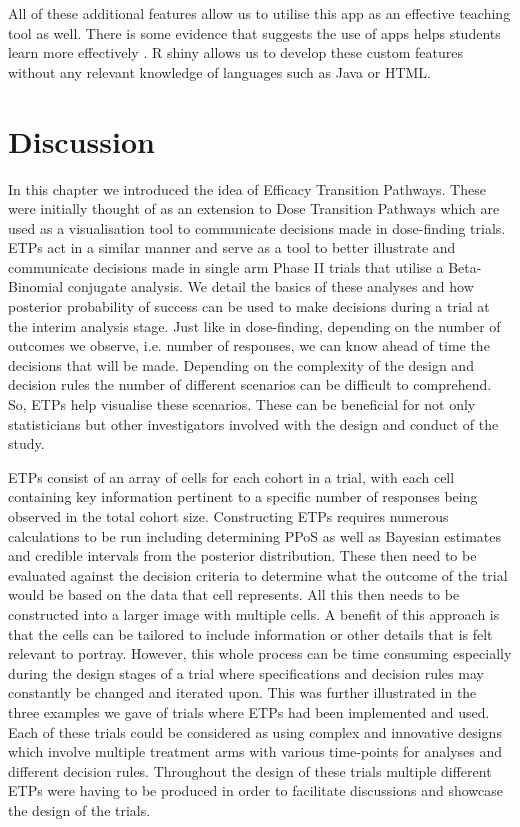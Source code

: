 All of these additional features allow us to utilise this app as an effective teaching tool as well. There is some evidence that suggests the use of apps helps students learn more effectively \cite{doiWebApplicationTeaching2016}. R shiny allows us to develop these custom features without any relevant knowledge of languages such as Java or HTML. 


\section{Discussion}

In this chapter we introduced the idea of Efficacy Transition Pathways. These were initially thought of as an extension to Dose Transition Pathways which are used as a visualisation tool to communicate decisions made in dose-finding trials. ETPs act in a similar manner and serve as a tool to better illustrate and communicate decisions made in single arm Phase \RN{2} trials that utilise a Beta-Binomial conjugate analysis. We detail the basics of these analyses and how posterior probability of success can be used to make decisions during a trial at the interim analysis stage. Just like in dose-finding, depending on the number of outcomes we observe, i.e. number of responses, we can know ahead of time the decisions that will be made. Depending on the complexity of the design and decision rules the number of different scenarios can be difficult to comprehend. So, ETPs help visualise these scenarios. These can be beneficial for not only statisticians but other investigators involved with the design and conduct of the study. 

ETPs consist of an array of cells for each cohort in a trial, with each cell containing key information pertinent to a specific number of responses being observed in the total cohort size. Constructing ETPs requires numerous calculations to be run including determining PPoS as well as Bayesian estimates and credible intervals from the posterior distribution. These then need to be evaluated against the decision criteria to determine what the outcome of the trial would be based on the data that cell represents. All this then needs to be constructed into a larger image with multiple cells. A benefit of this approach is that the cells can be tailored to include information or other details that is felt relevant to portray. However, this whole process can be time consuming especially during the design stages of a trial where specifications and decision rules may constantly be changed and iterated upon. This was further illustrated in the three examples we gave of trials where ETPs had been implemented and used. Each of these trials could be considered as using complex and innovative designs which involve multiple treatment arms with various time-points for analyses and different decision rules. Throughout the design of these trials multiple different ETPs were having to be produced in order to facilitate discussions and showcase the design of the trials. 

